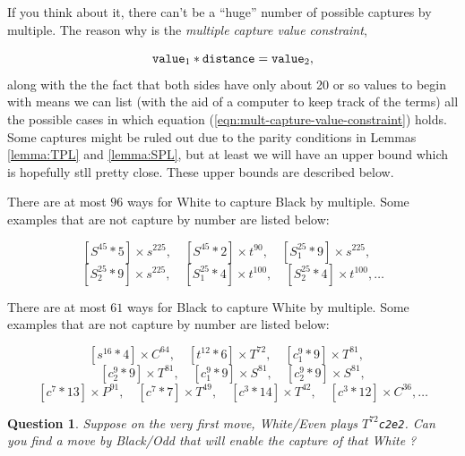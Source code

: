 \documentclass[14pt]{extarticle}
\newtheorem{question}{Question}
\begin{document}

If you think about it, there can't be a ``huge'' number of possible captures by
multiple. The reason why is the {\it multiple capture value
constraint},

\begin{equation}
\label{eqn:mult-capture-value-constraint}
{\tt  value}_1*{\tt distance} = {\tt value}_2,
\end{equation}
along with the the fact that both sides have only about 20 or so values
to begin with means we can list (with the aid of a computer to keep track
of the terms) all the possible cases in which
equation (\ref{eqn:mult-capture-value-constraint}) holds.
Some captures might be ruled out due to the parity
conditions in Lemmas \ref{lemma:TPL} and \ref{lemma:SPL},
but at least we will have an upper bound which is hopefully
stll pretty close.
These upper bounds are described below.

There are at most $96$ ways for White to capture Black by multiple.
Some examples that are not capture by number are listed below:

\[
[S^{45}  *  5]  \times  s^{225}, \quad
[S^{45}  *  2]  \times  t^{90}, \quad
[S_1^{25}   *  9]  \times  s^{225}, \quad
\]
\[
[S_2^{25}   *  9]  \times  s^{225}, \quad
[S_1^{25}  *  4]  \times  t^{100}, \quad
[S_2^{25}  *  4]  \times  t^{100}, \dots
\]

There are at most $61$ ways for Black to capture White by multiple.
Some examples that are not capture by number are listed below:

\[
[s^{16}  *  4]  \times  C^{64}, \quad
[t^{12}  *  6]  \times  T^{72},\quad
[c_1^{9}   *  9 ] \times  T^{81}, \quad
\]
\[
[c_2^{9}   *  9 ] \times  T^{81}, \quad
[c_1^{9}   *  9 ] \times  S^{81},\quad
[c_2^{9}   *  9 ] \times  S^{81},
\]
\[
[c^{7}  *  13]  \times  P^{91}, \quad
[c^{7}  *  7 ] \times  T^{49},\quad
[c^{3}  *  14]  \times  T^{42}, \quad
[c^{3}  *  12]  \times  C^{36}, \dots
\]

\begin{question}
Suppose on the very first move, White/Even plays
{\tt $T^{72}$c2e2}. Can you find a move by Black/Odd that will
enable the capture of that White \trianglepa?
\end{question}  
\end{document}
